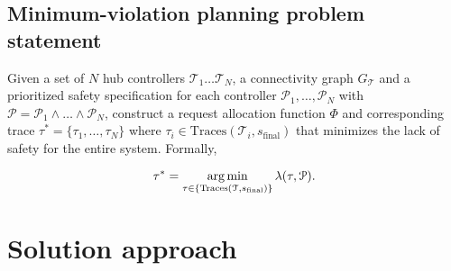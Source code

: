 \subsection{Minimum-violation planning problem statement} 
Given a set of $N$ hub controllers $\mathcal{T}_1 \dots \mathcal{T}_N$, a connectivity graph $G_{\mathcal{T}}$ and a prioritized safety specification for each controller $\mathcal{P}_1,\dots,\mathcal{P}_N$ with $\mathcal{P} = \mathcal{P}_1 \wedge \dots \wedge \mathcal{P}_N $, construct a request allocation function $\Phi$ and corresponding trace $\tau^* = \{\tau_1,\dots,\tau_N\}$ where  $\tau_i \in  \text{Traces}(\mathcal{T}_i,s_{\text{final}})$ that minimizes the lack of safety for the entire system. Formally,

\begin{equation}
    \tau^* = \operatorname*{arg\,min}_{\tau \in \{\text{Traces}(\mathcal{T},s_{\text{final}})\}} \lambda(\tau, \mathcal{P}).
\end{equation}


\section{Solution approach}

